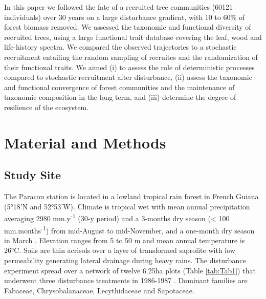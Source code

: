 \documentclass[fleqn,10pt]{ArtEcoFoG} %
\begin{document}
In this paper we followed the fate of a recruited tree communities
(60121 individuals) over 30 years on a large disturbance gradient, with
10 to 60\% of forest biomass removed. We assessed the taxonomic and
functional diversity of recruited trees, using a large functional trait
database covering the leaf, wood and life-history spectra. We compared
the observed trajectories to a stochastic recruitment entailing the
random sampling of recruites and the randomization of their functional
traits. We aimed (i) to assess the role of deterministic processes
compared to stochastic recruitment after disturbance, (ii) assess the
taxonomic and functional convergence of forest communities and the
maintenance of taxonomic composition in the long term, and (iii)
determine the degree of resilience of the ecosystem.

\section{Material and Methods}\label{material-and-methods}

\subsection{Study Site}\label{study-site}

The Paracou station is located in a lowland tropical rain forest in
French Guiana (5°18'N and 52°53'W). Climate is tropical wet with mean
annual precipitation averaging 2980 mm.y\textsuperscript{-1} (30-y
period) and a 3-months dry season (\textless{} 100
mm.months\textsuperscript{-1}) from mid-August to mid-November, and a
one-month dry season in March \citep{Wagner2011}. Elevation ranges from
5 to 50 m and mean annual temperature is 26°C. Soils are thin acrisols
over a layer of transformed saprolite with low permeability generating
lateral drainage during heavy rains. The disturbance experiment spread
over a network of twelve 6.25ha plots (Table \ref{tab:Tab1}) that
underwent three disturbance treatments in 1986-1987 \citep{Herault2018}.
Dominant families are Fabaceae, Chrysobalanaceae, Lecythidaceae and
Sapotaceae.
\end{document}
